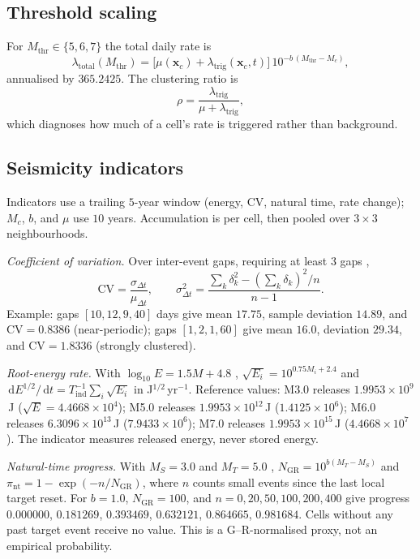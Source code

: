 \documentclass[11pt,a4paper]{article}
\newcommand{\dd}{\,\mathrm{d}}
\begin{document}
\subsection{Threshold scaling}
For $M_{\mathrm{thr}}\in\{5,6,7\}$ the total daily rate is
\begin{equation}
\lambda_{\text{total}}(M_{\mathrm{thr}})=
\big[\mu(\mathbf{x}_c)+\lambda_{\mathrm{trig}}(\mathbf{x}_c,t)\big]
\,10^{-b\,(M_{\mathrm{thr}}-M_c)},
\end{equation}
annualised by $365.2425$. The clustering ratio is
\begin{equation}
\rho=\frac{\lambda_{\mathrm{trig}}}{\mu+\lambda_{\mathrm{trig}}},
\end{equation}
which diagnoses how much of a cell's rate is triggered rather than
background.

\subsection{Seismicity indicators}
Indicators use a trailing $5$-year window (energy, CV, natural time, rate
change); $M_c$, $b$, and $\mu$ use $10$ years. Accumulation is per cell,
then pooled over $3\times3$ neighbourhoods.

\emph{Coefficient of variation.} Over inter-event gaps, requiring at
least $3$ gaps \cite{kagan1991,corral2004},
\begin{equation}
\mathrm{CV}=\frac{\sigma_{\Delta t}}{\mu_{\Delta t}},\qquad
\sigma^2_{\Delta t}=
\frac{\sum_k\delta_k^2-(\sum_k\delta_k)^2/n}{\,n-1\,}.
\end{equation}
Example: gaps $[10,12,9,40]$ days give mean
$17.75$, sample deviation $14.89$, and $\mathrm{CV}=0.8386$ (near-periodic);
gaps $[1,2,1,60]$ give mean $16.0$, deviation $29.34$, and
$\mathrm{CV}=1.8336$ (strongly clustered).

\emph{Root-energy rate.} With $\log_{10}E=1.5M+4.8$ \cite{hanks1979},
$\sqrt{E_i}=10^{0.75M_i+2.4}$ and
$\dd E^{1/2}/\dd t=T_{\text{ind}}^{-1}\sum_i\sqrt{E_i}$ in
J$^{1/2}$\,yr$^{-1}$. Reference values: M3.0 releases $1.9953\times10^9$\,J
($\sqrt{E}=4.4668\times10^4$); M5.0 releases $1.9953\times10^{12}$\,J
($1.4125\times10^6$); M6.0 releases $6.3096\times10^{13}$\,J
($7.9433\times10^6$); M7.0 releases $1.9953\times10^{15}$\,J
($4.4668\times10^7$). The indicator measures released energy, never stored
energy.

\emph{Natural-time progress.} With $M_S=3.0$ and $M_T=5.0$
\cite{rundle2016,rundle2021}, $N_{\mathrm{GR}}=10^{b(M_T-M_S)}$ and
$\pi_{\mathrm{nt}}=1-\exp(-n/N_{\mathrm{GR}})$, where $n$ counts small events
since the last local target reset. For $b=1.0$, $N_{\mathrm{GR}}=100$, and
$n=0,20,50,100,200,400$ give progress $0.000000$, $0.181269$, $0.393469$,
$0.632121$, $0.864665$, $0.981684$. Cells without any past target event
receive no value. This is a G--R-normalised proxy, not an empirical
probability.
\end{document}

